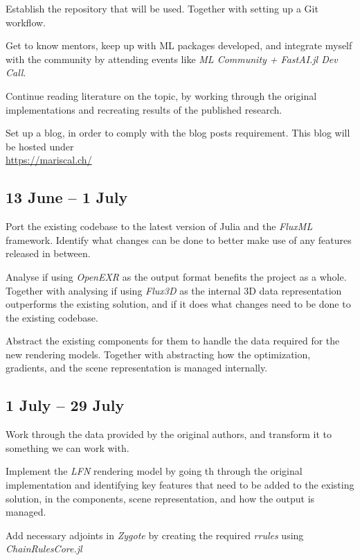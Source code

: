Establish the repository that will be used. Together with setting up a Git workflow.

Get to know mentors, keep up with ML packages developed, and integrate myself with the community by attending events like \textit{ML Community + FastAI.jl Dev Call}.

Continue reading literature on the topic, by working through the original implementations and recreating results of the published research.

Set up a blog, in order to comply with the blog posts requirement. This blog will be hosted under\\
\url{https://mariscal.ch/}

\subsection*{13 June -- 1 July}

Port the existing codebase to the latest version of Julia and the \textit{FluxML} framework. Identify what changes can be done to better make use of any features released in between.

Analyse if using \textit{OpenEXR} as the output format benefits the project as a whole. Together with analysing if using \textit{Flux3D} as the internal 3D data representation outperforms the existing solution, and if it does what changes need to be done to the existing codebase. 

Abstract the existing components for them to handle the data required for the new rendering models. Together with abstracting how the optimization, gradients, and the scene representation is managed internally.

\pagebreak

\subsection*{1 July -- 29 July}

Work through the data provided by the original authors, and transform it to something we can work with.

Implement the \textit{LFN} rendering model by going th through the original implementation and identifying key features that need to be added to the existing solution, in the components, scene representation, and how the output is managed.

Add necessary adjoints in \textit{Zygote} by creating the required \textit{rrules} using \textit{ChainRulesCore.jl}

